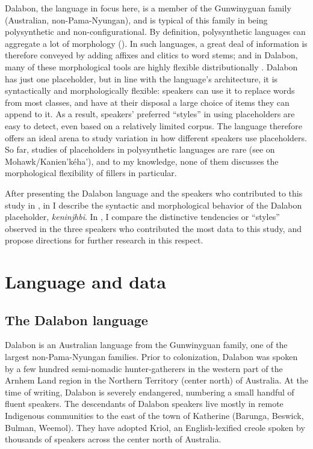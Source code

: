 \documentclass[output=paper]{langscibook}
\begin{document}
Dalabon, the language in focus here, is a member of the Gunwinyguan family (Australian, non-Pama-Nyungan), and is typical of this family in being polysynthetic and non-configurational. By definition, polysynthetic languages can aggregate a lot of morphology (\citealt{Evans2017}). In such languages, a great deal of information is therefore conveyed by adding affixes and clitics to word stems; and in Dalabon, many of these morphological tools are highly flexible distributionally \citep{Ponsonnet2015}. Dalabon has just one placeholder, but in line with the language’s architecture, it is syntactically and morphologically flexible: speakers can use it to replace words from most classes, and have at their disposal a large choice of items they can append to it. As a result, speakers’ preferred “styles” in using placeholders are easy to detect, even based on a relatively limited corpus. The language therefore offers an ideal arena to study variation in how different speakers use placeholders. So far, studies of placeholders in polysynthetic languages are rare (see  on Mohawk/Kanien’kéha’), and to my knowledge, none of them discusses the morphological flexibility of fillers in particular. 

After presenting the Dalabon language and the speakers who contributed to this study in , in  I describe the syntactic and morphological behavior of the Dalabon placeholder, \textit{keninjhbi}. In , I compare the distinctive tendencies or “styles” observed in the three speakers who contributed the most data to this study, and propose directions for further research in this respect. 

\section{Language and data}
\label{sec:ponsonnet:2}
\subsection{The Dalabon language}
\label{sec:ponsonnet:2.1}
Dalabon is an Australian language from the Gunwinyguan family, one of the largest non-Pama-Nyungan families. Prior to colonization, Dalabon was spoken by a few hundred semi-nomadic hunter-gatherers in the western part of the \mbox{Arnhem} Land region in the Northern Territory (center north) of Australia. At the time of writing, Dalabon is severely endangered, numbering a small handful of fluent speakers. The descendants of Dalabon speakers live mostly in remote Indigenous communities to the east of the town of Katherine (Barunga, Beswick, Bulman, Weemol). They have adopted Kriol, an English-lexified creole spoken by thousands of speakers across the center north of Australia.
\end{document}
